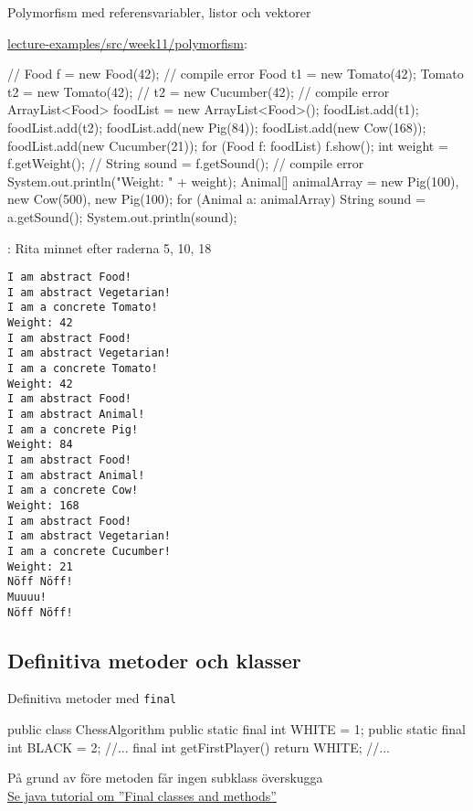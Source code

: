 \documentclass{lecturenotes}
\begin{document}
\begin{Slide}{Polymorfism med referensvariabler, listor och vektorer}
  \begin{minipage}{0.6\linewidth}   
\footnotesize\href{https://github.com/bjornregnell/lth-eda016-2015/tree/master/lectures/examples/eclipse-ws/lecture-examples/src/week11/polymorfism}{lecture-examples/src/week11/polymorfism}:


\begin{Code}[basicstyle=\ttfamily\fontsize{6}{7}\selectfont, numberstyle=,numbers=left]
// Food f = new Food(42);   // compile error
Food t1 = new Tomato(42);
Tomato t2 = new Tomato(42); 
// t2 = new Cucumber(42);   // compile error
ArrayList<Food> foodList = new ArrayList<Food>();
foodList.add(t1);
foodList.add(t2);
foodList.add(new Pig(84));
foodList.add(new Cow(168));
foodList.add(new Cucumber(21));
for (Food f: foodList){
    f.show();
    int weight = f.getWeight();
    // String sound = f.getSound(); // compile error
    System.out.println("Weight: " + weight);
}
Animal[] animalArray = 
    {new Pig(100), new Cow(500), new Pig(100)};
for (Animal a: animalArray){
    String sound = a.getSound();
    System.out.println(sound);
}
\end{Code}
: Rita minnet efter raderna 5, 10, 18
\end{minipage}
\hspace{0.5cm}
\begin{minipage}[]{0.2\linewidth}  \fontsize{7}{8}\selectfont
\begin{verbatim}
I am abstract Food!
I am abstract Vegetarian!
I am a concrete Tomato!
Weight: 42
I am abstract Food!
I am abstract Vegetarian!
I am a concrete Tomato!
Weight: 42
I am abstract Food!
I am abstract Animal!
I am a concrete Pig!
Weight: 84
I am abstract Food!
I am abstract Animal!
I am a concrete Cow!
Weight: 168
I am abstract Food!
I am abstract Vegetarian!
I am a concrete Cucumber!
Weight: 21
Nöff Nöff!
Muuuu!
Nöff Nöff!
\end{verbatim}
  \end{minipage}
\end{Slide}

\subsection{Definitiva metoder och klasser}
\begin{Slide}{Definitiva metoder med \texttt{final}}
\begin{Code}
public class ChessAlgorithm {
    public static final int WHITE = 1;
    public static final int BLACK = 2;
    //...
    final int getFirstPlayer() {
        return WHITE;
    }
    //...
}
\end{Code}
På grund av  före metoden får ingen subklass överskugga \\
\href{https://docs.oracle.com/javase/tutorial/java/IandI/final.html}{Se java tutorial om ''Final classes and methods''}\\
\end{Slide}
\end{document}
